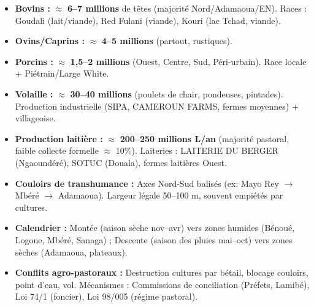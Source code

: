 \documentclass[11pt]{article}
\begin{document}
\begin{aretenir}
\begin{itemize}
    \item \textbf{Bovins :} $\approx$ \textbf{6--7 millions} de têtes (majorité Nord/Adamaoua/EN). Races : Goudali (lait/viande), Red Fulani (viande), Kouri (lac Tchad, viande).
    \item \textbf{Ovins/Caprins :} $\approx$ \textbf{4--5 millions} (partout, rustiques).
    \item \textbf{Porcins :} $\approx$ \textbf{1,5--2 millions} (Ouest, Centre, Sud, Péri-urbain). Race locale + Piétrain/Large White.
    \item \textbf{Volaille :} $\approx$ \textbf{30--40 millions} (poulets de chair, pondeuses, pintades). Production industrielle (SIPA, CAMEROUN FARMS, fermes moyennes) + villageoise.
    \item \textbf{Production laitière :} $\approx$ \textbf{200--250 millions L/an} (majorité pastoral, faible collecte formelle $\approx$ 10\%). Laiteries : LAITERIE DU BERGER (Ngaoundéré), SOTUC (Douala), fermes laitières Ouest.
\end{itemize}
\end{aretenir}

\begin{exemplebox}
\begin{itemize}
    \item \textbf{Couloirs de transhumance :} Axes Nord-Sud balisés (ex: Mayo Rey $\to$ Mbéré $\to$ Adamaoua). Largeur légale 50--100 m, souvent empiétés par cultures.
    \item \textbf{Calendrier :} Montée (saison sèche nov--avr) vers zones humides (Bénoué, Logone, Mbéré, Sanaga) ; Descente (saison des pluies mai--oct) vers zones sèches (Adamaoua, plateaux).
    \item \textbf{Conflits agro-pastoraux :} Destruction cultures par bétail, blocage couloirs, point d'eau, vol. Mécanismes : Commissions de conciliation (Préfets, Lamibé), Loi 74/1 (foncier), Loi 98/005 (régime pastoral).
\end{itemize}
\end{exemplebox}
\end{document}
